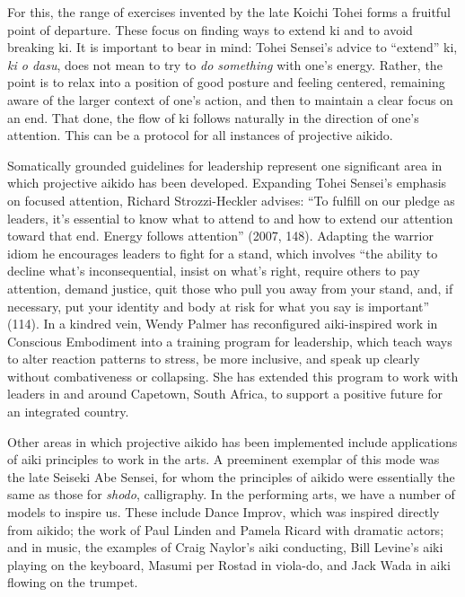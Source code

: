 \begin{enumerate}
For this, the range of exercises invented by the late Koichi Tohei forms a fruitful point of departure. These focus on finding ways to extend ki and to avoid breaking ki. It is important to bear in mind: Tohei Sensei's advice to ``extend'' ki, \emph{ki o dasu}, does not mean to try to \emph{do something} with one's energy. Rather, the point is to relax into a position of good posture and feeling centered, remaining aware of the larger context of one's action, and then to maintain a clear focus on an end. That done, the flow of ki follows naturally in the direction of one's attention. This can be a protocol for all instances of projective aikido.

Somatically grounded guidelines for leadership represent one significant area in which projective aikido has been developed. Expanding Tohei Sensei's emphasis on focused attention, Richard Strozzi-Heckler advises: ``To fulfill on our pledge as leaders, it's essential to know what to attend to and how to extend our attention toward that end. Energy follows attention'' (2007, 148). Adapting the warrior idiom he encourages leaders to fight for a stand, which involves ``the ability to decline what's inconsequential, insist on what's right, require others to pay attention, demand justice, quit those who pull you away from your stand, and, if necessary, put your identity and body at risk for what you say is important'' (114). In a kindred vein, Wendy Palmer has reconfigured aiki-inspired work in Conscious Embodiment into a training program for leadership, which teach ways to alter reaction patterns to stress, be more inclusive, and speak up clearly without combativeness or collapsing. She has extended this program to work with leaders in and around Capetown, South Africa, to support a positive future for an integrated country.

Other areas in which projective aikido has been implemented include applications of aiki principles to work in the arts. A preeminent exemplar of this mode was the late Seiseki Abe Sensei, for whom the principles of aikido were essentially the same as those for \emph{shodo}, calligraphy. In the performing arts, we have a number of models to inspire us. These include Dance Improv, which was inspired directly from aikido; the work of Paul Linden and Pamela Ricard with dramatic actors; and in music, the examples of Craig Naylor's aiki conducting, Bill Levine's aiki playing on the keyboard, Masumi per Rostad in viola-do, and Jack Wada in aiki flowing on the trumpet.


\end{enumerate}

